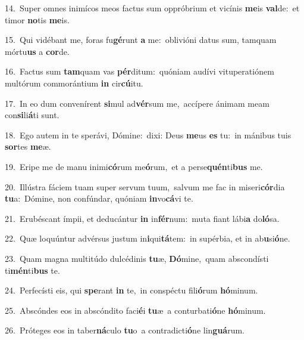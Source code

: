 {\numbfont\textcolor{\numbcolor}{14.}}~Super omnes inimícos meos factus sum oppróbrium et vicínis \textbf{me}\-is \textbf{val}\-de:~\star et timor \textbf{no}\-tis \textbf{me}\-is.\par
{\numbfont\textcolor{\numbcolor}{15.}}~Qui vidébant me, foras fu\-\textbf{gé}\-runt \textbf{a} me:~\star oblivióni datus sum, tamquam mórtu\textbf{us} a \textbf{cor}\-de.\par
{\numbfont\textcolor{\numbcolor}{16.}}~Factus sum \textbf{tam}\-quam vas \textbf{pér}\-ditum:~\star quóniam audívi vituperatiónem multórum commorántium \textbf{in} cir\-\textbf{cú}\-itu.\par
{\numbfont\textcolor{\numbcolor}{17.}}~In eo dum convenírent \textbf{si}\-mul ad\-\textbf{vér}\-sum me,~\star accípere ánimam meam con\-\textbf{si}\-li\-\textbf{á}\-ti sunt.\par
{\numbfont\textcolor{\numbcolor}{18.}}~Ego autem in te sperávi, Dómine:~\dagger dixi: Deus \textbf{me}\-us \textbf{es} tu:~\star in mánibus tuis \textbf{sor}\-tes \textbf{me}\-æ.\par
{\numbfont\textcolor{\numbcolor}{19.}}~Eripe me de manu inimi\-\textbf{có}\-rum me\-\textbf{ó}\-rum,~\star et a perse\-\textbf{quén}\-ti\textbf{bus} me.\par
{\numbfont\textcolor{\numbcolor}{20.}}~Illústra fáciem tuam super servum tuum,~\dagger salvum me fac in miseri\-\textbf{cór}\-dia \textbf{tu}\-a:~\star Dómine, non confúndar, quóniam \textbf{in}\-vo\-\textbf{cá}\-vi te.\par
{\numbfont\textcolor{\numbcolor}{21.}}~Erubéscant ímpii, et deducántur \textbf{in} in\-\textbf{fér}\-num:~\star muta fiant lábi\textbf{a} do\-\textbf{ló}\-sa.\par
{\numbfont\textcolor{\numbcolor}{22.}}~Quæ loquúntur advérsus justum in\-\textbf{i}\-qui\-\textbf{tá}\-tem:~\star in supérbia, et in ab\-\textbf{u}\-si\-\textbf{ó}\-ne.\par
{\numbfont\textcolor{\numbcolor}{23.}}~Quam magna multitúdo dulcédinis \textbf{tu}\-æ, \textbf{Dó}\-mine,~\star quam abscondísti ti\-\textbf{mén}\-ti\textbf{bus} te.\par
{\numbfont\textcolor{\numbcolor}{24.}}~Perfecísti eis, qui \textbf{spe}\-rant \textbf{in} te,~\star in conspéctu fili\-\textbf{ó}\-rum \textbf{hó}\-minum.\par
{\numbfont\textcolor{\numbcolor}{25.}}~Abscóndes eos in abscóndito faci\-\textbf{é}\-i \textbf{tu}\-æ~\star a conturbati\-\textbf{ó}\-ne \textbf{hó}\-minum.\par
{\numbfont\textcolor{\numbcolor}{26.}}~Próteges eos in taber\-\textbf{ná}\-culo \textbf{tu}\-o~\star a contradicti\-\textbf{ó}\-ne lin\-\textbf{guá}\-rum.\par
